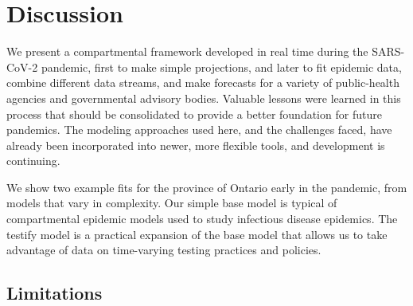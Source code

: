 \documentclass[12pt]{article}\usepackage[]{graphicx}\usepackage[]{color}
\begin{document}
\FloatBarrier

\section{Discussion}

We present a compartmental framework developed in real time during the SARS-CoV-2 pandemic, first to make simple projections, and later to fit epidemic data, combine different data streams, and make forecasts for a variety of public-health agencies and governmental advisory bodies. Valuable lessons were learned in this process that should be consolidated to provide a better foundation for future pandemics. The modeling approaches used here, and the challenges faced, have already been incorporated into newer, more flexible tools, and development is continuing.

We show two example fits for the province of Ontario early in the pandemic, from models that vary in complexity.  Our simple base model is typical of compartmental epidemic models used to study infectious disease epidemics.  The testify model is a practical expansion of the base model that allows us to take advantage of data on time-varying testing practices and policies.



\subsection{Limitations}
\end{document}
